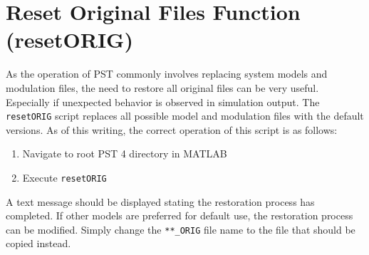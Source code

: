 \section{Reset Original Files Function (resetORIG)} 
As the operation of PST commonly involves replacing system models and modulation files, the need to restore all original files can be very useful.
Especially if unexpected behavior is observed in simulation output.
The \verb|resetORIG| script replaces all possible model and modulation files with the default versions.
As of this writing, the correct operation of this script is as follows:
\begin{enumerate}
\item Navigate to root PST 4 directory in MATLAB
\item Execute \verb|resetORIG|
\end{enumerate}

A text message should be displayed stating the restoration process has completed.
If other models are preferred for default use, the restoration process can be modified.
Simply change the \verb|**_ORIG| file name to the file that should be copied instead.